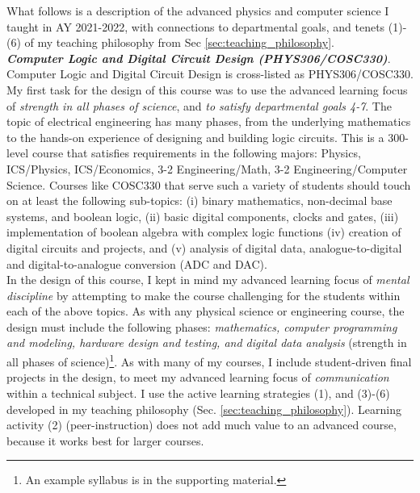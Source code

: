 \documentclass[../../../main.tex]{subfiles}
\begin{document}
What follows is a description of the advanced physics and computer science I taught in AY 2021-2022, with connections to departmental goals, and tenets (1)-(6) of my teaching philosophy from Sec \ref{sec:teaching_philosophy}.
\\
\vspace{0.25cm}
\textbf{\textit{Computer Logic and Digital Circuit Design (PHYS306/COSC330)}}. Computer Logic and Digital Circuit Design is cross-listed as PHYS306/COSC330.  My first task for the design of this course was to use the advanced learning focus of \textit{strength in all phases of science}, and \textit{to satisfy departmental goals 4-7}.  The topic of electrical engineering has many phases, from the underlying mathematics to the hands-on experience of designing and building logic circuits.  This is a 300-level course that satisfies requirements in the following majors: Physics, ICS/Physics, ICS/Economics, 3-2 Engineering/Math, 3-2 Engineering/Computer Science.  Courses like COSC330 that serve such a variety of students should touch on at least the following sub-topics: (i) binary mathematics, non-decimal base systems, and boolean logic, (ii) basic digital components, clocks and gates, (iii) implementation of boolean algebra with complex logic functions (iv) creation of digital circuits and projects, and (v) analysis of digital data, analogue-to-digital and digital-to-analogue conversion (ADC and DAC).
\\
\vspace{0.25cm}
In the design of this course, I kept in mind my advanced learning focus of \textit{mental discipline} by attempting to make the course challenging for the students within each of the above topics.  As with any physical science or engineering course, the design must include the following phases: \textit{mathematics, computer programming and modeling, hardware design and testing, and digital data analysis} (strength in all phases of science)\footnote{An example syllabus is in the supporting material.}.  As with many of my courses, I include student-driven final projects in the design, to meet my advanced learning focus of \textit{communication} within a technical subject.  I use the active learning strategies (1), and (3)-(6) developed in my teaching philosophy (Sec. \ref{sec:teaching_philosophy}).  Learning activity (2) (peer-instruction) does not add much value to an advanced course, because it works best for larger courses.
\\
\vspace{0.25cm}
\end{document}
